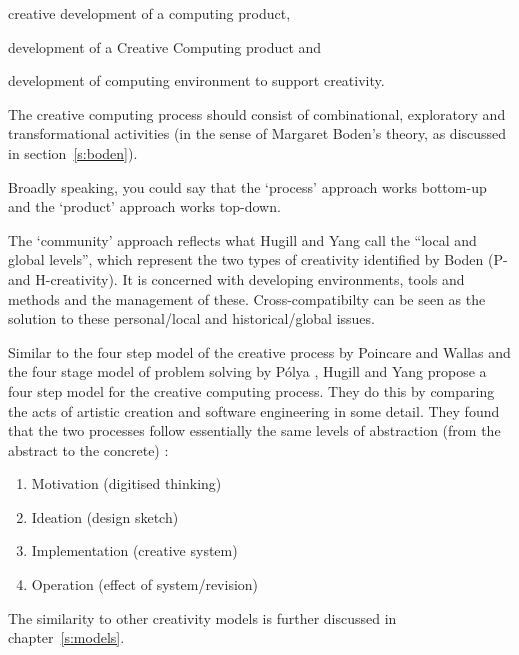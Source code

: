 \begin{description}[leftmargin=2.8cm]
  \item [Process] creative development of a computing product,
  \item [Product] development of a Creative Computing product and
  \item [Community] development of computing environment to support creativity.
\end{description}

The creative computing process should consist of combinational, exploratory and transformational activities (in the sense of Margaret Boden’s theory, as discussed in section~\ref{s:boden}).

Broadly speaking, you could say that the `process' approach works bottom-up and the `product' approach works top-down.

The `community' approach reflects what Hugill and Yang call the ``local and global levels'', which represent the two types of creativity identified by Boden (P- and H-creativity). It is concerned with developing environments, tools and methods and the management of these. Cross-compatibilty can be seen as the solution to these personal/local and historical/global issues.

Similar to the four step model of the creative process by Poincare and Wallas \autocite*{Poincare2001, Wallas1926} and the four stage model of problem solving by P{\'o}lya \autocite*{Polya1957}, Hugill and Yang propose a four step model for the creative computing process. They do this by comparing the acts of artistic creation and software engineering in some detail. They found that the two processes follow essentially the same levels of abstraction (from the abstract to the concrete) \autocite*{Hugill2013c}:

\begin{enumerate}
  \item Motivation (digitised thinking)
  \item Ideation (design sketch)
  \item Implementation (creative system)
  \item Operation (effect of system/revision)
\end{enumerate}

The similarity to other creativity models is further discussed in chapter~\ref{s:models}.


